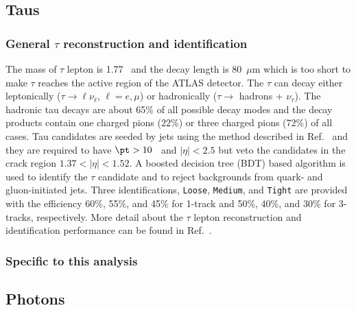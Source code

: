 
\subsection{Taus}
\label{subsec:event_Taus}


\subsubsection{General $\tau$ reconstruction and identification}
\label{subsubsec:event_taus_general}
The mass of $\tau$ lepton is 1.77~{\GeV} and the decay length is 80~$\mu$m which is too short to make $\tau$ reaches the active region of the ATLAS detector.
The $\tau$ can decay either leptonically ($\tau \to \ell \nu_{\ell}$, $\ell = e, \mu$) or hadronically ($\tau \to$ hadrons + $\nu_{\tau}$).
The hadronic tau decays are about 65\% of all possible decay modes and the decay products contain one charged pions (22\%) or three charged pions (72\%) of all cases.
Tau candidates are seeded by jets using the method described in Ref.~\cite{ATLAS:2017mpa} and they are required to have $\pt > 10$~{\GeV} and $|\eta| < 2.5$ but veto the candidates in the crack region $1.37 < |\eta| < 1.52$.
A boosted decision tree (BDT) based algorithm is used to identify the $\tau$ candidate and to reject backgrounds from quark- and gluon-initiated jets.
Three identifications, \texttt{Loose}, \texttt{Medium}, and \texttt{Tight} are provided with the efficiency 60\%, 55\%, and 45\% for 1-track and 50\%, 40\%, and 30\% for 3-tracks, respectively.
More detail about the $\tau$ lepton reconstruction and identification performance can be found in Ref.~\cite{ATLAS:2017mpa}.


\subsubsection{Specific to this analysis}
\label{subsubsec:event_taus_specific}


\subsection{Photons}
\label{subsec:event_photons}


